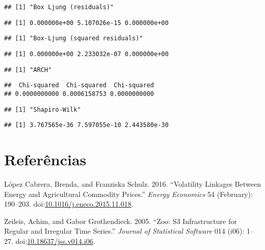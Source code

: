 \documentclass[]{article}
\begin{document}
\begin{verbatim}
## [1] "Box Ljung (residuals)"
\end{verbatim}

\begin{verbatim}
## [1] 0.000000e+00 5.107026e-15 0.000000e+00
\end{verbatim}

\begin{verbatim}
## [1] "Box-Ljung (squared residuals)"
\end{verbatim}

\begin{verbatim}
## [1] 0.000000e+00 2.233032e-07 0.000000e+00
\end{verbatim}

\begin{verbatim}
## [1] "ARCH"
\end{verbatim}

\begin{verbatim}
##  Chi-squared  Chi-squared  Chi-squared 
## 0.0000000000 0.0006158753 0.0000000000
\end{verbatim}

\begin{verbatim}
## [1] "Shapiro-Wilk"
\end{verbatim}

\begin{verbatim}
## [1] 3.767565e-36 7.597055e-10 2.443580e-30
\end{verbatim}

\pagebreak

\section*{Referências}\label{referencias}

\setlength{\parindent}{0in}

\hypertarget{refs}{}
\hypertarget{ref-lopez_cabrera_volatility_2016}{}
López Cabrera, Brenda, and Franziska Schulz. 2016. ``Volatility Linkages
Between Energy and Agricultural Commodity Prices.'' \emph{Energy
Economics} 54 (February): 190--203.
doi:\href{https://doi.org/10.1016/j.eneco.2015.11.018}{10.1016/j.eneco.2015.11.018}.

\hypertarget{ref-zeileis_zoo:_2005}{}
Zeileis, Achim, and Gabor Grothendieck. 2005. ``Zoo: S3 Infrastructure
for Regular and Irregular Time Series.'' \emph{Journal of Statistical
Software} 014 (i06): 1--27.
doi:\href{https://doi.org/10.18637/jss.v014.i06}{10.18637/jss.v014.i06}.
\end{document}
